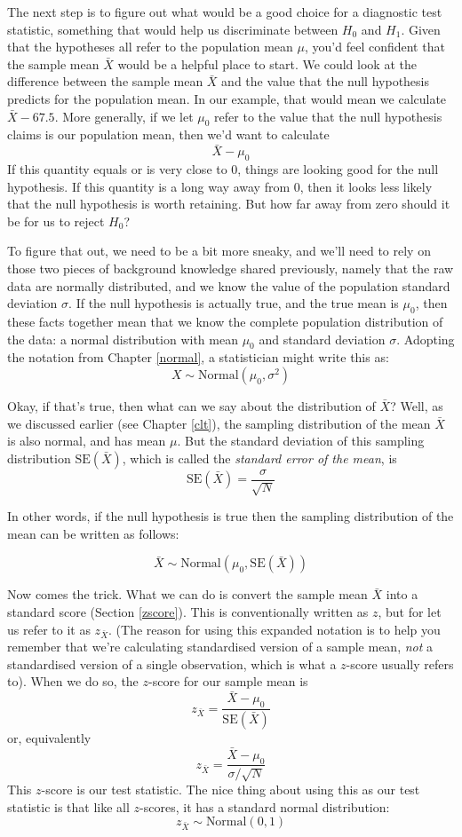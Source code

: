 \documentclass[
]{book}
\theoremstyle{definition}
\theoremstyle{definition}
\theoremstyle{definition}
\theoremstyle{definition}
\theoremstyle{remark}
\begin{document}
The next step is to figure out what would be a good choice for a diagnostic test statistic, something that would help us discriminate between \(H_0\) and \(H_1\). Given that the hypotheses all refer to the population mean \(\mu\), you'd feel confident that the sample mean \(\bar{X}\) would be a helpful place to start. We could look at the difference between the sample mean \(\bar{X}\) and the value that the null hypothesis predicts for the population mean. In our example, that would mean we calculate \(\bar{X} - 67.5\). More generally, if we let \(\mu_0\) refer to the value that the null hypothesis claims is our population mean, then we'd want to calculate
\[
\bar{X} - \mu_0
\]
If this quantity equals or is very close to 0, things are looking good for the null hypothesis. If this quantity is a long way away from 0, then it looks less likely that the null hypothesis is worth retaining. But how far away from zero should it be for us to reject \(H_0\)?

To figure that out, we need to be a bit more sneaky, and we'll need to rely on those two pieces of background knowledge shared previously, namely that the raw data are normally distributed, and we know the value of the population standard deviation \(\sigma\). If the null hypothesis is actually true, and the true mean is \(\mu_0\), then these facts together mean that we know the complete population distribution of the data: a normal distribution with mean \(\mu_0\) and standard deviation \(\sigma\). Adopting the notation from Chapter \ref{normal}, a statistician might write this as:
\[
X \sim \mbox{Normal}(\mu_0,\sigma^2)
\]

Okay, if that's true, then what can we say about the distribution of \(\bar{X}\)? Well, as we discussed earlier (see Chapter \ref{clt}), the sampling distribution of the mean \(\bar{X}\) is also normal, and has mean \(\mu\). But the standard deviation of this sampling distribution \(\mbox{SE}({\bar{X}})\), which is called the \emph{standard error of the mean}, is
\[
\mbox{SE}({\bar{X}}) = \frac{\sigma}{\sqrt{N}}
\]

In other words, if the null hypothesis is true then the sampling distribution of the mean can be written as follows:

\[
\bar{X} \sim \mbox{Normal}(\mu_0,\mbox{SE}({\bar{X}}))
\]

Now comes the trick. What we can do is convert the sample mean \(\bar{X}\) into a standard score (Section \ref{zscore}). This is conventionally written as \(z\), but for let us refer to it as \(z_{\bar{X}}\). (The reason for using this expanded notation is to help you remember that we're calculating standardised version of a sample mean, \emph{not} a standardised version of a single observation, which is what a \(z\)-score usually refers to). When we do so, the \(z\)-score for our sample mean is
\[
z_{\bar{X}} = \frac{\bar{X} - \mu_0}{\mbox{SE}({\bar{X}})}
\]
or, equivalently
\[
z_{\bar{X}} =  \frac{\bar{X} - \mu_0}{\sigma / \sqrt{N}}
\]
This \(z\)-score is our test statistic. The nice thing about using this as our test statistic is that like all \(z\)-scores, it has a standard normal distribution:
\[
z_{\bar{X}} \sim \mbox{Normal}(0,1)
\]
\end{document}
